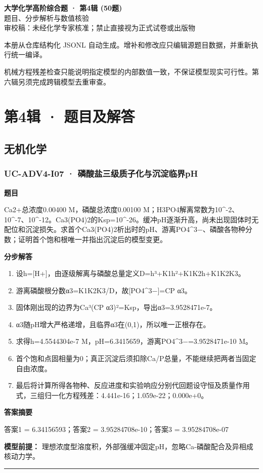 \documentclass[UTF8,11pt,a4paper]{ctexart}
\begin{document}
\begin{center}
{\LARGE\bfseries 大学化学高阶综合题 · 第4辑 (50题)}\\[0.8em]
{\large 题目、分步解析与数值核验}\\[0.5em]
{\small \textcolor{red!65!black}{审校稿：未经化学专家核准；禁止直接视为正式试卷或出版物}}
\end{center}
\vspace{1em}
\noindent 本册从仓库结构化 JSONL 自动生成。增补和修改应只编辑源题目数据，并重新执行统一编译。
\par 机械方程残差检查只能说明指定模型的内部数值一致，不保证模型现实可行性。第六辑另须完成跨辑模型去重审查。
\tableofcontents
\clearpage
\section*{第4辑 · 题目及解答}
\subsection*{无机化学}
\subsubsection*{UC-ADV4-I07 · 磷酸盐三级质子化与沉淀临界pH}
\noindent\textbf{题目}\par
Ca2+总浓度0.00400 M，磷酸总浓度0.00100 M；H3PO4解离常数为10\textasciicircum{}-2、10\textasciicircum{}-7、10\textasciicircum{}-12。Ca3(PO4)2的Ksp=10\textasciicircum{}-26。缓冲pH逐渐升高，尚未出现固体时无配位和沉淀损失。求首个Ca3(PO4)2析出时的pH、游离PO4\textasciicircum{}3−、磷酸各物种分数；证明首个饱和根唯一并指出沉淀后的模型变更。\par
\medskip\noindent\textbf{分步解答}
\begin{enumerate}
\item 设h=[H+]，由逐级解离与磷酸总量定义D=h³+K1h²+K1K2h+K1K2K3。
\item 游离磷酸根分数α3=K1K2K3/D，故[PO4\textasciicircum{}3−]=CP α3。
\item 固体刚出现的边界为Ca³(CP α3)²=Ksp，导出α3=3.9528471e-7。
\item α3随pH增大严格递增，且临界α3在(0,1)，所以唯一正根存在。
\item 求得h=4.5544304e-7 M，pH=6.3415659，游离PO4\textasciicircum{}3−=3.9528471e-10 M。
\item 首个饱和点固相量为0；真正沉淀后须扣除Ca/P总量，不能继续把两者当固定自由浓度。
\item 最后将计算所得各物种、反应进度和实验响应分别代回题设守恒及质量作用式，三组归一化方程残差：4.441e-16；1.059e-22；0.000e+0。
\end{enumerate}
\noindent\textbf{答案摘要}\par
答案1 = 6.34156593；答案2 = 3.95284708e-10；答案3 = 3.95284708e-07\par
\noindent\textbf{模型前提：}
理想浓度型溶度积，外部强缓冲固定pH，忽略Ca-磷酸配合及异相成核动力学。\par
\medskip\hrule\medskip
{}
\end{document}
